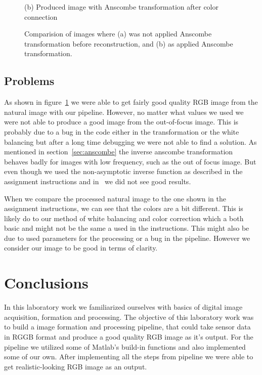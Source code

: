 \documentclass[12pt,a4paper,english
]{tunithesis}
\begin{document}
\begin{figure}[h]
\begin{minipage}[b]{0.45\textwidth}
    \caption*{(b) Produced image with Anscombe transformation after color connection}
  \end{minipage}
  \caption{Comparision of images where (a) was not applied Anscombe transformation before reconstruction, and (b) as applied Anscombe transformation.}
  \label{fig:comparison-white-balance}
\end{figure}

\section{Problems}
As shown in figure~\ref{fig:comparison-white-balance} we were able to get fairly good quality RGB image from the natural image with our pipeline. However, no matter what values we used we were not able to produce a good image from the out-of-focus image. This is probably due to a bug in the code either in the transformation or the white balancing but after a long time debugging we were not able to find a solution. As mentioned in section~\ref{sec:anscombe} the inverse anscombe transformation behaves badly for images with low frequency, such as the out of focus image. But even though we used the non-asymptotic inverse function as described in the assignment instructions and in~\cite{poissonnoise2011-2} we did not see good results.

When we compare the processed natural image to the one shown in the assignment instructions, we can see that the colors are a bit different. This is likely do to our method of white balancing and color correction which a both basic and might not be the same a used in the instructions. This might also be due to used parameters for the processing or a bug in the pipeline. However we consider our image to be good in terms of clarity.

\chapter{Conclusions}
\label{ch:conclusions}
In this laboratory work we familiarized ourselves with basics of digital image acquisition, formation and processing. The objective of this laboratory work was to build a image formation and processing pipeline, that could take sensor data in RGGB format and produce a good quality RGB image as it's output. For the pipeline we utilized some of Matlab's build-in functions and also implemented some of our own. After implementing all the steps from pipeline we were able to get realistic-looking RGB image as an output.
\end{document}
